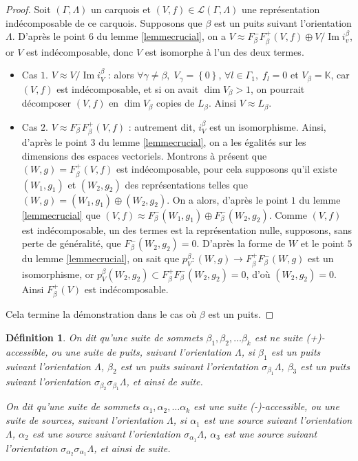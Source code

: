 \documentclass[a4paper,10pt]{article}
\newtheorem{defi}[thm]{Définition}%
\DeclareMathOperator{\Img}{Im}
\begin{document}
\begin{proof}
	Soit $(\Gamma,\Lambda)$ un carquois et $(V,f)\in\mathscr L(\Gamma,\Lambda)$ une représentation indécomposable de ce carquois. Supposons que $\beta$ est un puits suivant l'orientation $\Lambda$. D'après le point $6$ du lemme \ref{lemmecrucial}, on a $V\approx F_\beta^-F_\beta^+(V,f)\oplus V/\Img i_v^\beta$, or $V$ est indécomposable, donc $V$ est isomorphe à l'un des deux termes.
	\begin{itemize}
		\item Cas $1$. $V\approx V/\Img i_V^\beta$ : alors $\forall \gamma\neq\beta,\;V_\gamma=\left\{ 0 \right\}$, $\forall l\in\Gamma_1,\;f_l=0$ et $V_\beta=\mathbb K$, car $(V,f)$ est indécomposable, et si on avait $\dim V_\beta>1$, on pourrait décomposer $(V,f)$ en $\dim V_\beta$ copies de $L_\beta$. Ainsi $V\approx L_\beta$.
		\item Cas $2$. $V\approx F_\beta^-F_\beta^+(V,f)$ : autrement dit, $i_V^\beta$ est un isomorphisme. Ainsi, d'après le point $3$ du lemme \ref{lemmecrucial}, on a les égalités sur les dimensions des espaces vectoriels. Montrons à présent que $(W,g)=F_\beta^+(V,f)$ est indécomposable, pour cela supposons qu'il existe $(W_1,g_1)$ et $(W_2,g_2)$ des représentations telles que $(W,g)=(W_1,g_1)\oplus(W_2,g_2)$. On a alors, d'après le point $1$ du lemme \ref{lemmecrucial} que $(V,f)\approx F_\beta^-(W_1,g_1)\oplus F_\beta^-(W_2,g_2)$. Comme $(V,f)$ est indécomposable, un des termes est la représentation nulle, supposons, sans perte de généralité, que $F_\beta^-(W_2,g_2)=0$. D'après la forme de $W$ et le point $5$ du lemme \ref{lemmecrucial}, on sait que $p_V^\beta:(W,g)\rightarrow F_\beta^+F_\beta^-(W,g)$ est un isomorphisme, or $p_V^\beta(W_2,g_2)\subset F_\beta^+F_\beta^-(W_2,g_2)=0$, d'où $(W_2,g_2)=0$. Ainsi $F_\beta^+(V)$ est indécomposable. 
	\end{itemize}
Cela termine la démonstration dans le cas où $\beta$ est un puits.
\end{proof}
\begin{defi}
	On dit qu'une suite de sommets $\beta_1,\beta_2,\dots\beta_k$ est ne suite (+)-accessible, ou une \emph{suite de puits}, suivant l'orientation $\Lambda$, si $\beta_1$ est un puits suivant l'orientation $\Lambda$, $\beta_2$ est un puits suivant l'orientation $\sigma_{\beta_1}\Lambda$, $\beta_3$ est un puits suivant l'orientation $\sigma_{\beta_2}\sigma_{\beta_1}\Lambda$, et ainsi de suite.

	On dit qu'une suite de sommets $\alpha_1,\alpha_2,\dots\alpha_k$ est une suite (-)-accessible, ou une suite de sources, suivant l'orientation $\Lambda$, si $\alpha_1$ est une source suivant l'orientation $\Lambda$, $\alpha_2$ est une source suivant l'orientation $\sigma_{\alpha_1}\Lambda$, $\alpha_3$ est une source suivant l'orientation $\sigma_{\alpha_2}\sigma_{\alpha_1}\Lambda$, et ainsi de suite.
\end{defi}
\end{document}
